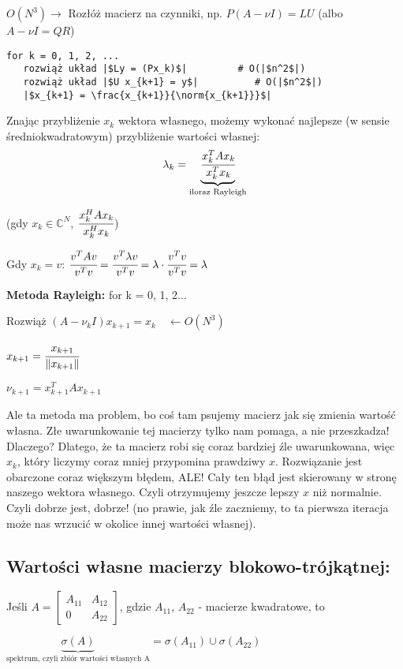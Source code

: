 \documentclass[hidelinks,a4paper,fleqn,oneside]{book}
\newcommand{\CC}{\mathbb{C}}
\newcommand{\ra}{\rightarrow}
\newcommand{\la}{\leftarrow}
\newcommand{\norm}[1]{\left\lVert#1\right\rVert}
\begin{document}
$O(N^3) \ra $ Rozłóż macierz na czynniki, np. $P(A-\nu I) = LU$ (albo $A - \nu I = QR$)
\begin{verbatim}
for k = 0, 1, 2, ...
   rozwiąż układ |$Ly = (Px_k)$|         # O(|$n^2$|)
   rozwiąż układ |$U x_{k+1} = y$|          # O(|$n^2$|)
   |$x_{k+1} = \frac{x_{k+1}}{\norm{x_{k+1}}}$|
\end{verbatim}
Znając przybliżenie $x_k$ wektora własnego, możemy wykonać najlepsze (w sensie średniokwadratowym) przybliżenie wartości własnej:
\[
	\lambda_k = \underbrace{\cfrac{x^T_k A x_k}{x_k^T x_k}}_{\textrm{iloraz Rayleigh}}
\]

(gdy $x_k \in \CC^N$, $\cfrac{x_k^H A x_k}{x_k^Hx_k}$)

Gdy $x_k = v$: $\cfrac{v^TAv}{v^Tv} = \cfrac{v^T \lambda v}{v^T v} = \lambda \cdot \cfrac{v^T v}{v^T v} = \lambda$


\textbf{Metoda Rayleigh:}
for k = 0, 1, 2...

Rozwiąż $(A - \nu_k I)x_{k+1} = x_k \quad \la O(N^3)$
 
$x_{k+1} = \cfrac{x_{k+1}}{\norm{x_{k+1}}}$

$\nu_{k+1} = x_{k+1}^T A x_{k+1}$
 
Ale ta metoda ma problem, bo coś tam psujemy macierz jak się zmienia wartość własna. Złe uwarunkowanie tej macierzy tylko nam pomaga, a nie przeszkadza! Dlaczego? Dlatego, że ta macierz robi się coraz bardziej źle uwarunkowana, więc $x_k$, który liczymy coraz mniej przypomina prawdziwy $x$. Rozwiązanie jest obarczone coraz większym błędem, ALE! Cały ten błąd jest skierowany w stronę naszego wektora własnego. Czyli otrzymujemy jeszcze lepszy $x$ niż normalnie. Czyli dobrze jest, dobrze! (no prawie, jak źle zaczniemy, to ta pierwsza iteracja może nas wrzucić w okolice innej wartości własnej). 


\subsection{Wartości własne macierzy blokowo-trójkątnej:}

Jeśli $A = \left[\begin{array}{c|c}A_{11} & A_{12} \\ \hline 0 & A_{22}\end{array}\right]$, gdzie $A_{11}$, $A_{22}$ - macierze kwadratowe, to

$\underbrace{\sigma(A)}_{\textrm{spektrum, czyli zbiór wartości własnych A}} = \sigma(A_{11}) \cup \sigma(A_{22})$
\end{document}
